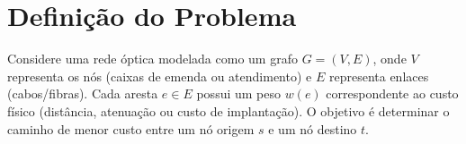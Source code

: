 \section{Definição do Problema} \label{sec:problem}

Considere uma rede óptica modelada como um grafo $G=(V,E)$,
onde $V$ representa os nós (caixas de emenda ou atendimento) e $E$ representa enlaces (cabos/fibras).
Cada aresta $e \in E$ possui um peso $w(e)$ correspondente ao custo físico (distância, atenuação ou custo de implantação).
O objetivo é determinar o caminho de menor custo entre um nó origem $s$ e um nó destino $t$.

